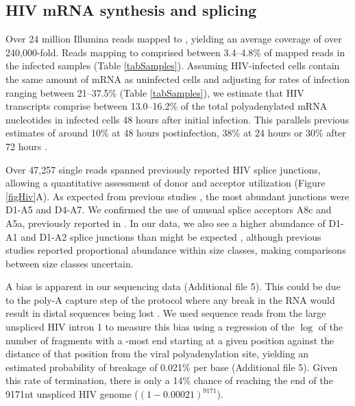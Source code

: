 \documentclass[../sherrill-Mix_thesis.tex]{subfiles}
\begin{document}
	\subsection{HIV mRNA synthesis and splicing} %
		Over 24 million Illumina reads mapped to \hivEight{}, yielding an average coverage of over 240,000-fold.  Reads mapping to \hivEight{} comprised between 3.4--4.8\% of mapped reads in the infected samples (Table \ref{tabSamples}). Assuming HIV-infected cells contain the same amount of mRNA as uninfected cells and adjusting for rates of infection ranging between 21--37.5\% (Table \ref{tabSamples}), we estimate that HIV transcripts comprise between 13.0--16.2\% of the total polyadenylated mRNA nucleotides in infected cells 48 hours after initial infection. This parallels previous estimates of around 10\% \citep{Whisnant2013} at 48 hours postinfection, 38\% at 24 hours \citep{Chang2011} or 30\% after 72 hours \citep{Corbeil2001}. %

		Over 47,257 single reads spanned previously reported HIV splice junctions, allowing a quantitative assessment of donor and acceptor utilization (Figure \ref{figHiv}A). As expected from previous studies \citep{Purcell1993,Ocwieja2012}, the most abundant junctions were D1-A5 and D4-A7.  We confirmed the use of unusual splice acceptors A8c and A5a, previously reported in \hivEight{} \citep{Ocwieja2012}. In our data, we also see a higher abundance of D1-A1 and D1-A2 splice junctions than might be expected \citep{Purcell1993,Ocwieja2012}, although previous studies reported proportional abundance within size classes, making comparisons between size classes uncertain. %

		A \threePrime{} bias is apparent in our sequencing data (Additional file 5). This could be due to the poly-A capture step of the protocol where any break in the RNA would result in distal \fivePrime{} sequences being lost \citep{Lahens2014}. We used sequence reads from the large unspliced HIV intron 1 to measure this bias using a regression of the $\log$ of the number of fragments with a \fivePrime{}-most end starting at a given position against the distance of that position from the viral polyadenylation site, yielding an estimated probability of breakage of 0.021\% per base (Additional file 5). Given this rate of termination, there is only a 14\% chance of reaching the \fivePrime{} end of the 9171nt unspliced HIV genome (\((1-0.00021)^{9171}\)). 
\end{document}
